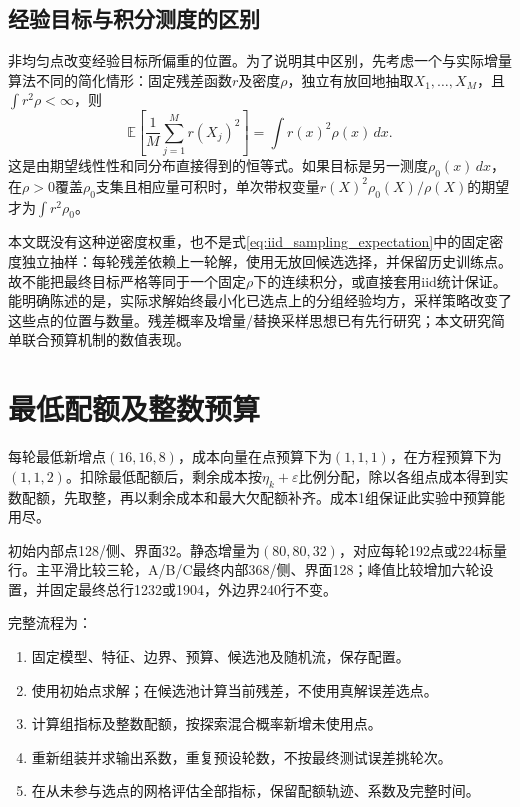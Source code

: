 \subsection{经验目标与积分测度的区别}
非均匀点改变经验目标所偏重的位置。为了说明其中区别，先考虑一个与实际增量算法不同的简化情形：固定残差函数$r$及密度$\rho$，独立有放回地抽取$X_1,\ldots,X_M$，且$\int r^2\rho<\infty$，则
\begin{equation}\label{eq:iid_sampling_expectation}
\mathbb E\left[\frac1M\sum_{j=1}^M r(X_j)^2\right]=\int r(x)^2\rho(x)\,dx.
\end{equation}
这是由期望线性性和同分布直接得到的恒等式。如果目标是另一测度$\rho_0(x)\,dx$，在$\rho>0$覆盖$\rho_0$支集且相应量可积时，单次带权变量$r(X)^2\rho_0(X)/\rho(X)$的期望才为$\int r^2\rho_0$。

本文既没有这种逆密度权重，也不是式\eqref{eq:iid_sampling_expectation}中的固定密度独立抽样：每轮残差依赖上一轮解，使用无放回候选选择，并保留历史训练点。故不能把最终目标严格等同于一个固定$\rho$下的连续积分，或直接套用iid统计保证。能明确陈述的是，实际求解始终最小化已选点上的分组经验均方，采样策略改变了这些点的位置与数量。残差概率及增量/替换采样思想已有先行研究\cite{rar}；本文研究简单联合预算机制的数值表现。

\section{最低配额及整数预算}
每轮最低新增点$(16,16,8)$，成本向量在点预算下为$(1,1,1)$，在方程预算下为$(1,1,2)$。扣除最低配额后，剩余成本按$\eta_k+\varepsilon$比例分配，除以各组点成本得到实数配额，先取整，再以剩余成本和最大欠配额补齐。成本1组保证此实验中预算能用尽。

初始内部点128/侧、界面32。静态增量为$(80,80,32)$，对应每轮192点或224标量行。主平滑比较三轮，A/B/C最终内部368/侧、界面128；峰值比较增加六轮设置，并固定最终总行1232或1904，外边界240行不变。

完整流程为：\begin{enumerate}
\item 固定模型、特征、边界、预算、候选池及随机流，保存配置。
\item 使用初始点求解；在候选池计算当前残差，不使用真解误差选点。
\item 计算组指标及整数配额，按探索混合概率新增未使用点。
\item 重新组装并求输出系数，重复预设轮数，不按最终测试误差挑轮次。
\item 在从未参与选点的网格评估全部指标，保留配额轨迹、系数及完整时间。
\end{enumerate}

